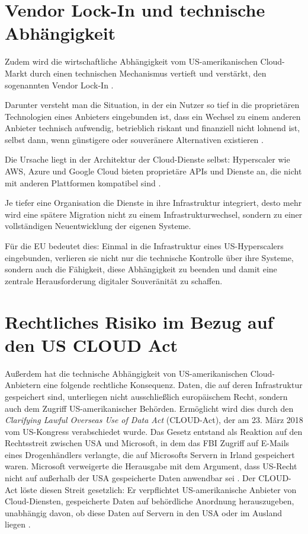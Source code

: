 \section{Vendor Lock-In und technische Abhängigkeit} 
Zudem wird die wirtschaftliche Abhängigkeit vom US-amerikanischen Cloud-Markt 
durch einen technischen Mechanismus vertieft und verstärkt, den 
sogenannten Vendor Lock-In \cite{oparamartins2016vendor}. 

Darunter versteht man die Situation, in der
ein Nutzer so tief in die proprietären Technologien eines Anbieters 
eingebunden ist, dass ein Wechsel zu einem anderen Anbieter technisch 
aufwendig, betrieblich riskant und finanziell nicht lohnend ist, selbst 
dann, wenn günstigere oder souveränere Alternativen existieren \cite{oparamartins2016vendor}. 

Die Ursache liegt in der Architektur der Cloud-Dienste selbst: Hyperscaler 
wie \ac{AWS}, Azure und Google Cloud bieten proprietäre \ac{API}s und Dienste an, 
die nicht mit anderen Plattformen kompatibel sind \cite{tovar2024cloud}. 

Je tiefer eine Organisation die Dienste in ihre
Infrastruktur integriert, desto mehr wird eine spätere Migration nicht 
zu einem Infrastrukturwechsel, sondern zu einer vollständigen 
Neuentwicklung der eigenen Systeme. 

Für die \ac{EU} bedeutet dies: Einmal in die Infrastruktur eines US-Hyperscalers 
eingebunden, verlieren sie nicht nur die technische Kontrolle über ihre 
Systeme, sondern auch die Fähigkeit, diese Abhängigkeit zu 
beenden und damit eine zentrale Herausforderung digitaler Souveränität zu schaffen.

\section{Rechtliches Risiko im Bezug auf den US CLOUD Act}
\label{sec:cloudact}
Außerdem hat die technische Abhängigkeit von US-amerikanischen Cloud-Anbietern 
eine folgende rechtliche Konsequenz. Daten, die auf deren 
Infrastruktur gespeichert sind, unterliegen nicht ausschließlich 
europäischem Recht, sondern auch dem Zugriff US-amerikanischer Behörden. 
Ermöglicht wird dies durch den \textit{Clarifying Lawful Overseas Use of 
Data Act} (\ac{CLOUD-Act}), der am 23. März 2018 vom US-Kongress 
verabschiedet wurde. Das Gesetz entstand als Reaktion auf den Rechtsstreit 
zwischen USA und Microsoft, in dem das \ac{FBI} Zugriff 
auf E-Mails eines Drogenhändlers verlangte, die auf Microsofts Servern 
in Irland gespeichert waren. Microsoft verweigerte die Herausgabe mit 
dem Argument, dass US-Recht nicht auf außerhalb der \ac{USA} gespeicherte 
Daten anwendbar sei \cite{christakis2019cloudact}. Der \ac{CLOUD-Act} löste diesen Streit gesetzlich: Er
verpflichtet US-amerikanische Anbieter von Cloud-Diensten, gespeicherte 
Daten auf behördliche Anordnung herauszugeben, unabhängig davon, ob 
diese Daten auf Servern in den \ac{USA} oder im Ausland liegen \cite{dsbzh2026cloudact}.


